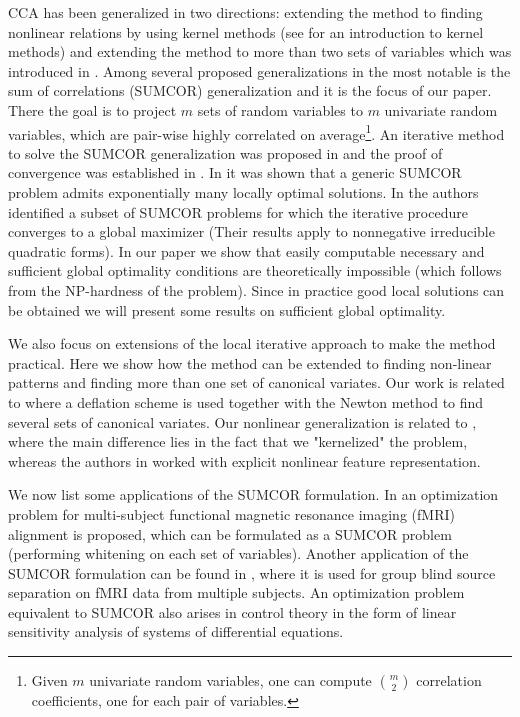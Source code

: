  CCA has been generalized in two directions: extending the method to finding nonlinear relations  by using kernel methods \cite{FBMJ}\cite{HardoonCCA} (see \cite{shawe-taylor04kernel} for an introduction to kernel methods) and extending the method to more than two sets of variables which was introduced in \cite{Kettenring}. Among several proposed generalizations in \cite{Kettenring} the most notable is the sum of correlations (SUMCOR) generalization and it is the focus of our paper. There the goal is to project $m$ sets of random variables to $m$ univariate random variables, which are pair-wise highly correlated on average\footnote{Given $m$ univariate random variables, one can compute $\binom{m}{2}$ correlation coefficients, one for each pair of variables.}. An iterative method to solve the SUMCOR generalization was proposed in \cite{Horst} and the proof of convergence was established in \cite{Chu}. In \cite{Chu} it was shown that a generic SUMCOR problem admits exponentially many locally optimal solutions.
 In \cite{GlobalMEP2} the authors identified a subset of SUMCOR problems for which the iterative procedure converges to a global maximizer (Their results apply to nonnegative irreducible quadratic forms).
In our paper we show that easily computable necessary and sufficient global optimality conditions are theoretically impossible (which follows from the NP-hardness of the problem). Since in
practice good local solutions can be obtained we will present some results on sufficient global optimality.

We also focus on extensions of the local iterative approach \cite{Horst} to make the method practical. Here we show how the method can be extended to finding non-linear patterns and finding more than one set of canonical variates. Our work is related to \cite{JointBSSAppl} where a deflation scheme is used together with the Newton method to find several sets of canonical variates. Our nonlinear generalization is related to \cite{nonlinJointBSS}, where the main difference lies in the fact that we "kernelized" the problem, whereas the authors in \cite{nonlinJointBSS} worked with explicit nonlinear feature representation.

We now list some applications of the SUMCOR formulation. In \cite{kernelHyperAppl} an optimization problem for multi-subject functional magnetic resonance imaging (fMRI) alignment is proposed, which can be formulated as a SUMCOR problem (performing whitening on each set of variables). Another application of the SUMCOR formulation can be found in \cite{JointBSSAppl}, where it is used for group blind source separation on fMRI data from multiple subjects. An optimization problem equivalent to SUMCOR also arises in control theory \cite{ControlApplication} in the form of linear sensitivity analysis of systems of differential equations.
\vspace{-0.1cm}
